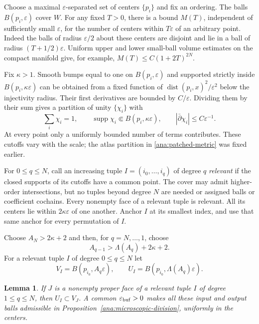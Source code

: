 \documentclass[11pt,reqno]{amsart}
\numberwithin{equation}{section}
\newtheorem{lemma}[theorem]{Lemma}
\theoremstyle{definition}
\theoremstyle{remark}
\DeclareMathOperator{\supp}{supp}
\DeclareMathOperator{\dist}{dist}
\begin{document}
Choose a maximal $\varepsilon$-separated set of centers
$\{p_i\}$ and fix an ordering.  The balls $B(p_i,\varepsilon)$
cover $W$.  For any fixed $T>0$, there is a bound $M(T)$,
independent of sufficiently small $\varepsilon$, for the number of
centers within $T\varepsilon$ of an arbitrary point.  Indeed the
balls of radius $\varepsilon/2$ about these centers are disjoint
and lie in a ball of radius $(T+1/2)\varepsilon$.
Uniform upper and lower small-ball volume estimates on the compact
manifold give, for example, $M(T)\leq C(1+2T)^{2N}$.

Fix $\kappa>1$.  Smooth bumps equal to one on
$B(p_i,\varepsilon)$ and supported strictly inside
$B(p_i,\kappa\varepsilon)$ can be obtained from a fixed function of
$\dist(p_i,x)^2/\varepsilon^2$ below the injectivity radius.
Their first derivatives are bounded by $C/\varepsilon$.
Dividing them by their sum gives a partition of unity $\{\chi_i\}$
with
\begin{equation}\label{ana:shrinking-cutoffs}
 \sum_i\chi_i=1,\qquad
 \supp\chi_i\Subset B(p_i,\kappa\varepsilon),\qquad
 |\bar\partial\chi_i|\leq C\varepsilon^{-1}.
\end{equation}
At every point only a uniformly bounded number of terms contributes.
These cutoffs vary with the scale; the atlas partition in
\eqref{ana:patched-metric} was fixed earlier.

For $0\leq q\leq N$, call an increasing tuple
$I=(i_0,\ldots,i_q)$ of degree $q$ \emph{relevant} if the closed
supports of its cutoffs have a common point. The cover may admit
higher-order intersections, but no tuples beyond degree $N$ are
needed or assigned balls or coefficient cochains.  Every nonempty face
of a relevant tuple is relevant.  All its centers lie within
$2\kappa\varepsilon$ of one another.  Anchor $I$ at its smallest
index, and use that same anchor for every permutation of $I$.

Choose $A_N>2\kappa+2$ and then, for $q=N,\ldots,1$, choose
\begin{equation}\label{ana:buffer-recursion}
 A_{q-1}>\Lambda(A_q)+2\kappa+2.
\end{equation}
For a relevant tuple $I$ of degree $0\leq q\leq N$ let
\[
 V_I=B(p_{i_0},A_q\varepsilon),
 \qquad
 U_I=B(p_{i_0},\Lambda(A_q)\varepsilon).
\]

\begin{lemma}\label{ana:buffers}
If $J$ is a nonempty proper face of a relevant tuple $I$ of degree
$1\leq q\leq N$, then $U_I\subset V_J$.  A common $\varepsilon_{\rm buf}>0$
makes all these input and output balls admissible in
Proposition~\ref{ana:microscopic-division}, uniformly in the centers.
\end{lemma}
\end{document}
